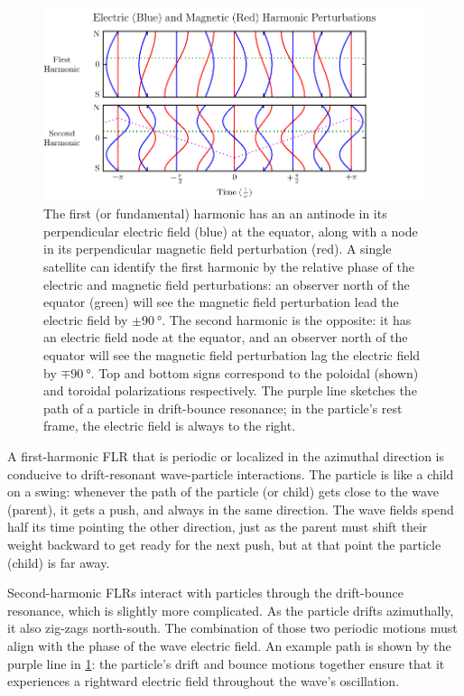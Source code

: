 \begin{figure}[!htb]
  \centering
  \includegraphics[width=\textwidth]{figures/harmonics.pdf}
  \caption[First and Second Harmonic Resonances]{
    The first (or fundamental) harmonic has an an antinode in its perpendicular
    electric field (blue) at the equator, along with a node in its
    perpendicular magnetic field perturbation (red). A single satellite can
    identify the first harmonic by the relative phase of the electric and
    magnetic field perturbations: an observer north of the equator (green) will
    see the magnetic field perturbation lead the electric field by
    $\pm\SI{90}{\degree}$. The second harmonic is the opposite: it has an
    electric field node at the equator, and an observer north of the equator
    will see the magnetic field perturbation lag the electric field by
    $\mp\SI{90}{\degree}$. Top and bottom signs correspond to the poloidal
    (shown) and toroidal polarizations respectively. The purple line sketches
    the path of a particle in drift-bounce resonance; in the particle's rest
    frame, the electric field is always to the right. 
  }
  \label{fig_harmonics}
\end{figure}

A first-harmonic FLR that is periodic or localized in the azimuthal direction
is conducive to drift-resonant wave-particle
interactions\cite{dai_2013,poulter_1983}. The particle is like a child on a
swing: whenever the path of the particle (or child) gets close to the wave
(parent), it gets a push, and always in the same direction. The wave fields
spend half its time pointing the other direction, just as the parent must shift
their weight backward to get ready for the next push, but at that point the
particle (child) is far away. 

Second-harmonic FLRs interact with particles through the drift-bounce
resonance, which is slightly more complicated. As the particle drifts
azimuthally, it also zig-zags north-south. The combination of those two
periodic motions must align with the phase of the wave electric field. An
example path is shown by the purple line in \cref{fig_harmonics}: the
particle's drift and bounce motions together ensure that it experiences a
rightward electric field throughout the wave's oscillation. 

